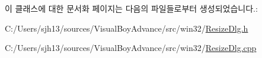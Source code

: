 이 클래스에 대한 문서화 페이지는 다음의 파일들로부터 생성되었습니다.\+:\begin{DoxyCompactItemize}
\item 
C\+:/\+Users/sjh13/sources/\+Visual\+Boy\+Advance/src/win32/\mbox{\hyperlink{_resize_dlg_8h}{Resize\+Dlg.\+h}}\item 
C\+:/\+Users/sjh13/sources/\+Visual\+Boy\+Advance/src/win32/\mbox{\hyperlink{_resize_dlg_8cpp}{Resize\+Dlg.\+cpp}}\end{DoxyCompactItemize}
